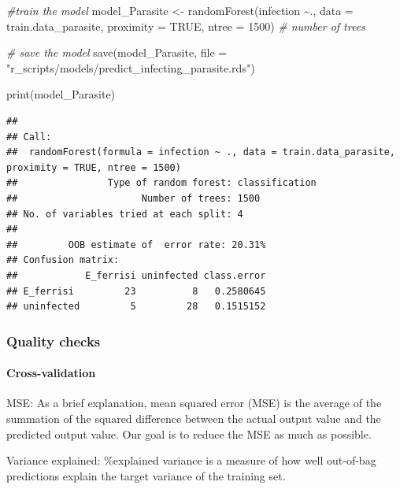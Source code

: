 \documentclass[
]{article}
\newenvironment{Shaded}{\begin{snugshade}}{\end{snugshade}}
\newcommand{\AttributeTok}[1]{\textcolor[rgb]{0.77,0.63,0.00}{#1}}
\newcommand{\CommentTok}[1]{\textcolor[rgb]{0.56,0.35,0.01}{\textit{#1}}}
\newcommand{\ConstantTok}[1]{\textcolor[rgb]{0.00,0.00,0.00}{#1}}
\newcommand{\DecValTok}[1]{\textcolor[rgb]{0.00,0.00,0.81}{#1}}
\newcommand{\FunctionTok}[1]{\textcolor[rgb]{0.00,0.00,0.00}{#1}}
\newcommand{\NormalTok}[1]{#1}
\newcommand{\OtherTok}[1]{\textcolor[rgb]{0.56,0.35,0.01}{#1}}
\newcommand{\SpecialCharTok}[1]{\textcolor[rgb]{0.00,0.00,0.00}{#1}}
\newcommand{\StringTok}[1]{\textcolor[rgb]{0.31,0.60,0.02}{#1}}
\begin{document}
\begin{Shaded}
\begin{Highlighting}[]
\CommentTok{\#train the model}
\NormalTok{model\_Parasite }\OtherTok{\textless{}{-}} \FunctionTok{randomForest}\NormalTok{(infection }\SpecialCharTok{\textasciitilde{}}\NormalTok{., }
                               \AttributeTok{data =}\NormalTok{ train.data\_parasite, }\AttributeTok{proximity =} \ConstantTok{TRUE}\NormalTok{,}
                      \AttributeTok{ntree =} \DecValTok{1500}\NormalTok{) }\CommentTok{\# number of trees}

\CommentTok{\# save the model }
\FunctionTok{save}\NormalTok{(model\_Parasite, }\AttributeTok{file =}  \StringTok{"r\_scripts/models/predict\_infecting\_parasite.rds"}\NormalTok{)}

\FunctionTok{print}\NormalTok{(model\_Parasite)}
\end{Highlighting}
\end{Shaded}

\begin{verbatim}
## 
## Call:
##  randomForest(formula = infection ~ ., data = train.data_parasite,      proximity = TRUE, ntree = 1500) 
##                Type of random forest: classification
##                      Number of trees: 1500
## No. of variables tried at each split: 4
## 
##         OOB estimate of  error rate: 20.31%
## Confusion matrix:
##            E_ferrisi uninfected class.error
## E_ferrisi         23          8   0.2580645
## uninfected         5         28   0.1515152
\end{verbatim}

\hypertarget{quality-checks}{%
\subsubsection{Quality checks}\label{quality-checks}}

\hypertarget{cross-validation-2}{%
\paragraph{Cross-validation}\label{cross-validation-2}}

MSE: As a brief explanation, mean squared error (MSE) is the average of
the summation of the squared difference between the actual output value
and the predicted output value. Our goal is to reduce the MSE as much as
possible.

Variance explained: \%explained variance is a measure of how well
out-of-bag predictions explain the target variance of the training set.
\end{document}

